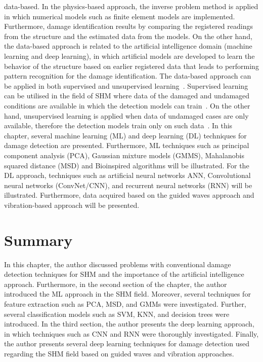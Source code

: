 \documentclass[b5paper, 11pt, openany, titlepage]{book}
\begin{document}
data-based.
In the physics-based approach, the inverse problem method is applied in which numerical models such as finite element models are implemented. 
Furthermore, damage identification results by comparing the registered readings from the structure and the estimated data from the models.
On the other hand,  the data-based approach is related to the artificial intelligence domain (machine learning and deep learning), in which artificial models are developed to learn the behavior of the structure based on earlier registered data that leads to performing pattern recognition for the damage identification.
The data-based approach can be applied in both supervised and unsupervised learning~\cite{worden2007application}.
Supervised learning can be utilised in the field of SHM where data of the damaged and undamaged conditions are available in which the detection models can train~\cite{figueiredo2018machine}.
On the other hand, unsupervised learning is applied when data of undamaged cases are only available, therefore the detection models train only on such data~\cite{figueiredo2018machine}. 
In this chapter, several machine learning (ML) and deep learning (DL) techniques for damage detection are presented.
Furthermore, ML techniques such as principal component analysis (PCA), Gaussian mixture models (GMMS), Mahalanobis squared distance (MSD) and Bioinspired algorithms will be illustrated.
For the DL approach, techniques such as artificial neural networks ANN, Convolutional neural networks (ConvNet/CNN), and recurrent neural networks (RNN) will be illustrated.
Furthermore, data acquired based on the guided waves approach and vibration-based approach will be presented. 




\section{Summary}
In this chapter, the author discussed problems with conventional damage detection techniques for SHM and the importance of the artificial intelligence approach.
Furthermore, in the second section of the chapter, the author introduced the ML approach in the SHM field.
Moreover, several techniques for feature extraction such as PCA, MSD, and GMMs were investigated. 
Further, several classification models such as SVM, KNN, and decision trees were introduced.
In the third section, the author presents the deep learning approach, in which techniques such as CNN  and RNN were thoroughly investigated.
Finally, the author presents several deep learning techniques for damage detection used regarding the SHM field based on guided waves and vibration approaches.
\end{document}
